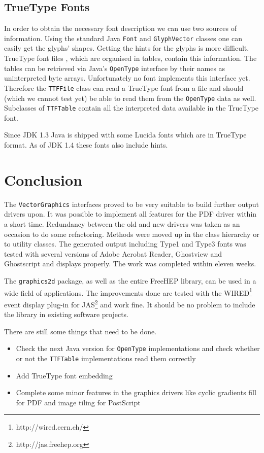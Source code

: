 \documentclass[a4paper]{article}
\newcommand{\freehep}{\textsf{FreeHEP}}
\newcommand{\class}[1]{\texttt{#1}}
\newcommand{\fhclass}[1]{\class{#1}}
\newcommand{\ps}{PostScript}
\newcommand{\pdf}{PDF}
\begin{document}
\subsection{TrueType Fonts}

In order to obtain the necessary font description we can use two
sources of information. Using the standard Java \class{Font} and
\class{GlyphVector} classes one can easily get the glyphs'
shapes. Getting the hints for the glyphs is more difficult. TrueType
font files \cite{ttf}, which are organised in tables, contain this
information. The tables can be retrieved via Java's \class{OpenType}
interface by their names as uninterpreted byte arrays. Unfortunately
no font implements this interface yet. Therefore the \fhclass{TTFFile}
class can read a TrueType font from a file and should (which we cannot
test yet) be able to read them from the \class{OpenType} data as
well. Subclasses of \fhclass{TTFTable} contain all the interpreted
data available in the TrueType font.

Since JDK 1.3 Java is shipped with some Lucida fonts which are
in TrueType format. As of JDK 1.4 these fonts also include hints.





\section{Conclusion}

The \fhclass{VectorGraphics} interfaces proved to be very suitable to
build further output drivers upon. It was possible to implement
all features for the \pdf{} driver within a short time. Redundancy
between the old and new drivers was taken as an occasion 
to do some refactoring. Methods were moved up in the class hierarchy
or to utility classes. The generated output including Type1 and Type3
fonts was tested with several versions of Adobe Acrobat Reader,
Ghostview and Ghostscript and displays properly. The work was
completed within eleven weeks.

The \fhclass{graphics2d} package, as well as the entire \freehep{}
library, can be used in a wide field of applications. The improvements
done are tested with the WIRED\footnote{http://wired.cern.ch/}
event display plug-in for JAS\footnote{http://jas.freehep.org} and
work fine. It should be no problem to include the library in existing
software projects.

\bigskip

\noindent
There are still some things that need to be done.
\begin{itemize}
\item Check the next Java version for \class{OpenType} implementations
  and check whether or not the \fhclass{TTFTable} implementations read
  them correctly
\item Add TrueType font embedding
\item Complete some minor features in the graphics drivers like
  cyclic gradients fill for \pdf{} and image tiling for \ps{}
\end{itemize}
\end{document}
